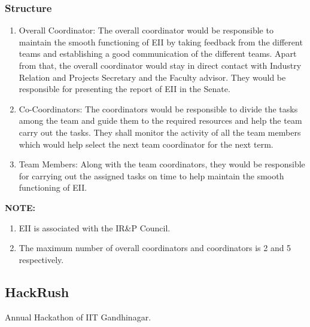 \documentclass[12pt]{article}
\begin{document}
\subsubsection{Structure}
\begin{enumerate}
    \item Overall Coordinator: The overall coordinator would be responsible to maintain the smooth functioning of EII by taking feedback from the different teams and establishing a good communication of the different teams. Apart from that, the overall coordinator would stay in direct contact with Industry Relation and Projects Secretary and the Faculty advisor. They would be responsible for presenting the report of EII in the Senate.
    \item Co-Coordinators: The coordinators would be responsible to divide the tasks among the team and guide them to the required resources and help the team carry out the tasks. They shall monitor the activity of all the team members which would help select the next team coordinator for the next term.
    \item Team Members: Along with the team coordinators, they would be responsible for carrying out the assigned tasks on time to help maintain the smooth functioning of EII.
\end{enumerate}
\textbf{NOTE:} \begin{enumerate}
    \item EII is associated with the IR\&P Council.
    \item The maximum number of overall coordinators and coordinators is 2 and 5 respectively.
\end{enumerate}

\subsection{HackRush}

Annual Hackathon of IIT Gandhinagar.
\end{document}
